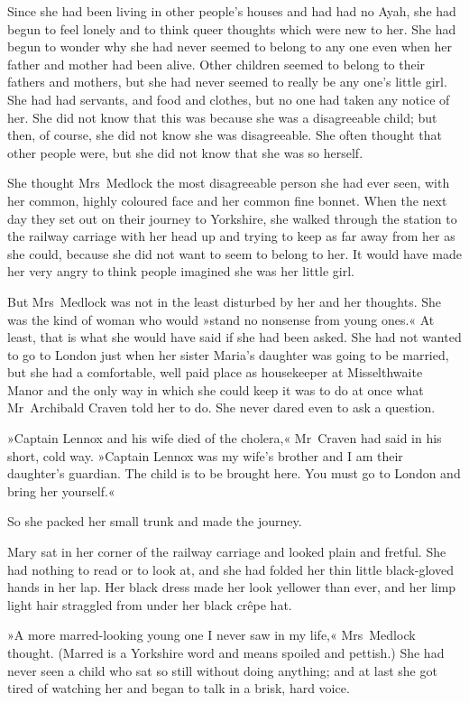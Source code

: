 Since she had been living in other people's houses and had had no Ayah, she had begun to feel lonely and to think queer thoughts which were new to her. She had begun to wonder why she had never seemed to belong to any one even when her father and mother had been alive. Other children seemed to belong to their fathers and mothers, but she had never seemed to really be any one's little girl. She had had servants, and food and clothes, but no one had taken any notice of her. She did not know that this was because she was a disagreeable child; but then, of course, she did not know she was disagreeable. She often thought that other people were, but she did not know that she was so herself.

She thought Mrs~Medlock the most disagreeable person she had ever seen, with her common, highly coloured face and her common fine bonnet. When the next day they set out on their journey to Yorkshire, she walked through the station to the railway carriage with her head up and trying to keep as far away from her as she could, because she did not want to seem to belong to her. It would have made her very angry to think people imagined she was her little girl.

But Mrs~Medlock was not in the least disturbed by her and her thoughts. She was the kind of woman who would »stand no nonsense from young ones.« At least, that is what she would have said if she had been asked. She had not wanted to go to London just when her sister Maria's daughter was going to be married, but she had a comfortable, well paid place as housekeeper at Misselthwaite Manor and the only way in which she could keep it was to do at once what Mr~Archibald Craven told her to do. She never dared even to ask a question.

»Captain Lennox and his wife died of the cholera,« Mr~Craven had said in his short, cold way. »Captain Lennox was my wife's brother and I am their daughter's guardian. The child is to be brought here. You must go to London and bring her yourself.«

So she packed her small trunk and made the journey.

Mary sat in her corner of the railway carriage and looked plain and fretful. She had nothing to read or to look at, and she had folded her thin little black-gloved hands in her lap. Her black dress made her look yellower than ever, and her limp light hair straggled from under her black crêpe hat.

»A more marred-looking young one I never saw in my life,« Mrs~Medlock thought. (Marred is a Yorkshire word and means spoiled and pettish.) She had never seen a child who sat so still without doing anything; and at last she got tired of watching her and began to talk in a brisk, hard voice.

